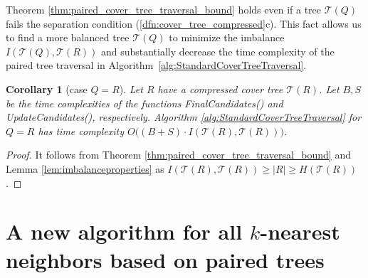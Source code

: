 \documentclass[a4paper,UKenglish,cleveref, autoref]{lipics-v2019}
\numberwithin{algocf}{section}
\theoremstyle{definition}
\theoremstyle{definition}
\theoremstyle{definition}
\theoremstyle{plain}
\newtheorem{cor}[algocf]{Corollary}
\newcommand{\T}{\mathcal{T}}
\begin{document}

Theorem \ref{thm:paired_cover_tree_traversal_bound} holds even if a tree $\T(Q)$ fails the separation condition (\ref{dfn:cover_tree_compressed}c). 
This fact allows us to find a more balanced tree $\T(Q)$ to minimize the imbalance $I(\T(Q), \T(R))$ and substantially decrease the time complexity of the paired tree traversal in Algorithm~\ref{alg:StandardCoverTreeTraversal}.

\begin{cor}[case $Q = R$]
\label{cor:generalRunTime}
Let $R$ have a compressed cover tree $\T(R)$.
Let $B,S$ be the time complexities of the functions FinalCandidates() and UpdateCandidates(), respectively.
Algorithm \ref{alg:StandardCoverTreeTraversal} for $Q=R$ has time complexity $O\Big((B+S) \cdot I(\T(R), \T(R))\Big) $.
\end{cor}
\begin{proof}
It follows from Theorem \ref{thm:paired_cover_tree_traversal_bound} and Lemma \ref{lem:imbalanceproperties} as $I(\T(R), \T(R)) \geq |R| \geq H(\T(R))$.
\end{proof}

\section{A new algorithm for all $k$-nearest neighbors based on paired trees}
\label{sec:CorrectDualTreeKNN}
\end{document}

